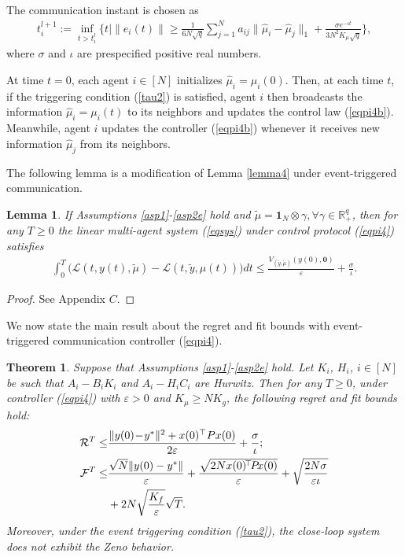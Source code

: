 \documentclass[final,5p,times,twocolumn,authoryear]{elsarticle}
\newtheorem{theorem}{ {Theorem}}
\newtheorem{lemma}{ {Lemma}}
\begin{document}
	The communication instant is chosen as
	\begin{align}
		t_i^{l+1}\!:=\!\inf_{t>t_i^l}\!\Big\{t\Big|\|e_i(t)\|{\ge}\frac{1}{6N\!\sqrt{q}}\!\sum_{j=1}^N \!a_{i\!j} \|\hat\mu_i{-}\hat\mu_j\|_{1} {+} \frac{\sigma e^{-\iota t}}{3N^{2}K_{\!\mu}\!\sqrt{q}}\Big\},\label{tau2}
	\end{align}
	where $\sigma$ and $\iota$ are prespecified positive real numbers. 
	
	At time $t=0$, each agent $i\in[N]$ initializes $\hat\mu_i=\mu_i(0)$. Then, at each time $t$, if the triggering condition (\ref{tau2}) is satisfied, agent $i$ then broadcasts the information $\hat\mu_i=\mu_i(t)$ to its neighbors and updates the control law (\ref{eqpi4b}). Meanwhile, agent $i$ updates the controller (\ref{eqpi4b}) whenever it receives new information $\hat\mu_j$ from its neighbors.
	
	
	The following lemma is a modification of Lemma \ref{lemma4} under event-triggered communication.
	
	
	\begin{lemma}\label{lemma6}
		If Assumptions \ref{asp1}-\ref{asp2e} hold and $\tilde{\mu}= \boldsymbol1_N \otimes \gamma, \forall \gamma\in \mathbb{R}_+^q$, then for any $T\ge0$ the linear multi-agent system (\ref{eqsys}) under control protocol (\ref{eqpi4}) satisfies
		\begin{align}
			\int_{0}^{T} \Big(\mathcal{L}(t,y(t),\tilde{\mu}){-}\mathcal{L}(t,\tilde{y},\mu(t))\Big)dt{\le}\frac{V_{(\tilde{y}, \tilde{\mu})}(y(0), \boldsymbol{0})}{\varepsilon} {+} \frac{\sigma}{\iota}.
		\end{align}
	\end{lemma}
	\begin{proof}
		See Appendix $C$.
	\end{proof}
	
	We now state the main result about the regret and fit bounds with event-triggered communication controller (\ref{eqpi4}).
	
	\begin{theorem}\label{th3}
		Suppose that Assumptions \ref{asp1}-\ref{asp2e} hold. Let $K_i$, $H_i$, $i\in[N]$ be such that $A_i-B_iK_i$ and $A_i-H_iC_i$ are Hurwitz. Then for any $T\ge0$, under controller (\ref{eqpi4}) with $\varepsilon>0$ and $K_\mu \ge NK_g$, the following regret and fit bounds hold:
		\begin{align}
			\mathcal{R}^T\le &\frac{\|y(0)\!-\!y^*\|^2 + x(0)^\top P x(0)}{2\varepsilon} +\frac{\sigma}{\iota};\notag\\
			\mathcal{F}^T\le &\frac{\sqrt{N}\|y(0)-y^*\|}{\varepsilon}  +
			\frac{\sqrt{2N x(0)^{\!\top} \!P\! x(0)}}{\varepsilon}
			+\sqrt{\frac{2N\sigma}{\varepsilon\iota}} \notag\\
			&+ 2N\sqrt{\frac{K_f}{\varepsilon}}\sqrt{T}.\notag
		\end{align}
		Moreover, under the event triggering condition (\ref{tau2}), the close-loop system does not exhibit the Zeno behavior.
	\end{theorem}
	
\end{document}
